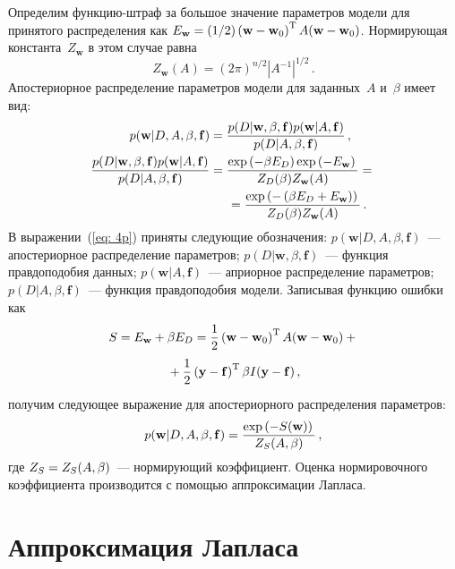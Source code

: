 \begin{multicols}{2}
Определим функцию-штраф за большое значение параметров модели для принятого 
распределения как 
$E_\mathbf{w}\hm=({1}/{2})\left(\mathbf{w} \hm- \mathbf{w}_0\right)^{\mathrm{T}}A(\mathbf{w} 
\hm- \mathbf{w}_0)$. Нормирующая константа~$Z_\mathbf{w}$ в этом случае равна
\begin{equation}
\label {eq: Zw}
Z_\mathbf{w}(A)=(2\pi)^{{n}/{2}}|A^{-1}|^{{1}/{2}}\,.
\end{equation}
Апостериорное распределение параметров модели для заданных~$A$
и~$\beta$ имеет вид:
\begin{align}
\label {eq: 4p}
p(\mathbf{w}|D,A,\beta,\mathbf{f})&=
\displaystyle\frac{\displaystyle p(D|\mathbf{w},\beta,\mathbf{f})p(\mathbf{w}|A,\mathbf{f})\mathstrut}{\displaystyle p(D|A,\beta,\mathbf{f})\mathstrut}\,,
\\
\displaystyle\frac{\displaystyle p(D|\mathbf{w},\beta,\mathbf{f})p(\mathbf{w}|A,\mathbf{f})\mathstrut}{\displaystyle p(D|A,\beta,\mathbf{f})\mathstrut}&=\displaystyle\frac{\displaystyle \exp\left(-\beta E_D\right)
\exp\left(-E_\mathbf{w}\right)\mathstrut}{\displaystyle Z_{D}
(\beta)Z_{\mathbf{w}}(A)\mathstrut}={}\notag\\
&\hspace*{5mm}{}=
\displaystyle\frac{\displaystyle \exp\left(-\left(\beta E_D+E_\mathbf{w}\right)\right)\mathstrut}{\displaystyle Z_{D}(\beta)Z_{\mathbf{w}}(A)\mathstrut}\,.\notag
\end{align}
В выражении~(\ref{eq: 4p}) приняты следующие обозначения:
$p(\mathbf{w}|D,A,\beta,\mathbf{f})$~--- апостериорное распределение параметров;
$p(D|\mathbf{w},\beta,\mathbf{f})$~--- функция правдоподобия данных;
$p(\mathbf{w}|A,\mathbf{f})$~--- априорное распределение па\-ра\-мет\-ров;
$p(D|A,\beta,\mathbf{f})$~--- функция правдоподобия модели.
Записывая функцию ошибки как
\begin{multline}
\label {eq: S(w)}
S=E_\mathbf{w}+\beta E_D=\displaystyle\frac{\displaystyle 1\mathstrut}{\displaystyle 2\mathstrut}\left(\mathbf{w}-\mathbf{w}_0\right)^{\mathrm{T}}
A(\mathbf{w}-\mathbf{w}_0)+{}\\
{}+\displaystyle\frac{\displaystyle 1\mathstrut}{\displaystyle 2\mathstrut}\left(\mathbf{y}-\mathbf{f}\right)^{\mathrm{T}}
\beta I(\mathbf{y}-\mathbf{f})\,,
\end{multline}
получим следующее выражение для апостериорного распределения параметров: 
$$
p(\mathbf{w}|D,A,\beta,\mathbf{f})=
\displaystyle\frac{\displaystyle \exp\left(-S(\mathbf{w})\right)\mathstrut}{\displaystyle Z_S(A,\beta)\mathstrut}\,,
$$ 
где $Z_S\hm=Z_{S}(A,\beta)$~--- нормирующий коэффициент. Оценка нормировочного 
коэффициента производится с помощью аппроксимации Лапласа.

\section{Аппроксимация Лапласа}


\end{multicols}
